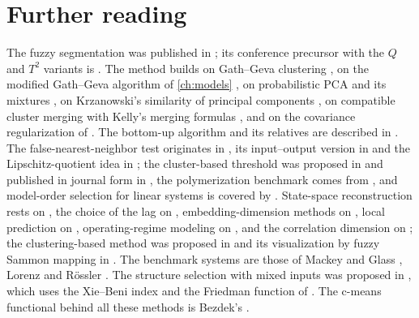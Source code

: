 
\section{Further reading}\label{sec:ts:reading}

The fuzzy segmentation was published in \cite{abonyi:2005:segmentation}; its conference precursor with the $Q$ and $T^2$ variants is \cite{abonyi:2003:segmentation}. The method builds on Gath--Geva clustering \cite{gath:1989}, on the modified Gath--Geva algorithm of \cref{ch:models} \cite{abonyi:2002:mgg}, on probabilistic PCA and its mixtures \cite{tipping:1999:ppca}, on Krzanowski's similarity of principal components \cite{krzanowski:1979:pca}, on compatible cluster merging \cite{kaymak:1995:merging} with Kelly's merging formulas \cite{kelly:1994:merging}, and on the covariance regularization of \cite{babuska:2002:covariance}. The bottom-up algorithm and its relatives are described in \cite{keogh:2001:online,himberg:2001:segmentation}. The false-nearest-neighbor test originates in \cite{kennel:1992:fnn}, its input--output version in \cite{rhodes:1998:fnn,bomberger:1998:narx} and the Lipschitz-quotient idea in \cite{he:1993:lipschitz}; the cluster-based threshold was proposed in \cite{feil:2003:fnn} and published in journal form in \cite{feil:2004:fnn}, the polymerization benchmark comes from \cite{doyle:1995:polymerization}, and model-order selection for linear systems is covered by \cite{ljung:1999:sysid}. State-space reconstruction rests on \cite{takens:1981,sauer:1991:embedology}, the choice of the lag on \cite{fraser:1986:mutualinfo}, embedding-dimension methods on \cite{kennel:1992:fnn,cao:1997:embedding,jiang:2003:embedding}, local prediction on \cite{farmer:1987:prediction,casdagli:1989:prediction}, operating-regime modeling on \cite{murraysmith:1997:multiple,babuska:1998:book}, and the correlation dimension on \cite{grassberger:1983}; the clustering-based method was proposed in \cite{abonyi:2004:chaotic} and its visualization by fuzzy Sammon mapping in \cite{feil:2007:fuzzsam}. The benchmark systems are those of Mackey and Glass \cite{mackey:1977:oscillation}, Lorenz \cite{lorenz:1963} and R\"ossler \cite{rossler:1976}. The structure selection with mixed inputs was proposed in \cite{girimonte:2004:structure}, which uses the Xie--Beni index \cite{xie:1991:validity} and the Friedman function of \cite{friedman:1991:mars}. The c-means functional behind all these methods is Bezdek's \cite{bezdek:1981}.
